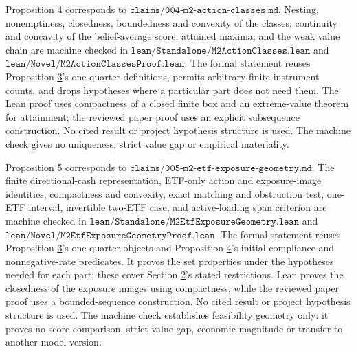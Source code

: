\documentclass[11pt]{article}
\begin{document}
Proposition \hyperref[res:Proposition-4]{4} corresponds to \(\texttt{claims/004-m2-action-classes.md}\). Nesting,
nonemptiness, closedness, boundedness and convexity of the classes; continuity and
concavity of the belief-average score; attained maxima; and the weak value chain
are machine checked in \(\texttt{lean/Standalone/M2ActionClasses.lean}\) and
\(\texttt{lean/Novel/M2ActionClassesProof.lean}\). The formal statement reuses
Proposition \hyperref[res:Proposition-3]{3}'s one-quarter definitions, permits arbitrary finite instrument
counts, and drops hypotheses where a particular part does not need them. The Lean proof
uses compactness of a closed finite box and an extreme-value theorem for
attainment; the reviewed paper proof uses an explicit subsequence construction.
No cited result or project hypothesis structure is used. The machine check gives
no uniqueness, strict value gap or empirical materiality.

Proposition \hyperref[res:Proposition-5]{5} corresponds to \(\texttt{claims/005-m2-etf-exposure-geometry.md}\).
The finite directional-cash representation, ETF-only action and exposure-image
identities, compactness and convexity, exact matching and obstruction test,
one-ETF interval, invertible two-ETF case, and active-loading span criterion
are machine checked in
\(\texttt{lean/Standalone/M2EtfExposureGeometry.lean}\) and
\(\texttt{lean/Novel/M2EtfExposureGeometryProof.lean}\). The formal statement
reuses Proposition \hyperref[res:Proposition-3]{3}'s one-quarter objects and Proposition \hyperref[res:Proposition-4]{4}'s initial-compliance and
nonnegative-rate predicates. It proves the set properties under the hypotheses
needed for each part; these cover Section \hyperref[sec:2]{2}'s stated restrictions. Lean proves the
closedness of the exposure images using compactness, while the reviewed paper
proof uses a bounded-sequence construction. No cited result or project
hypothesis structure is used. The machine check establishes feasibility
geometry only: it proves no score comparison, strict value gap, economic
magnitude or transfer to another model version.
\end{document}
